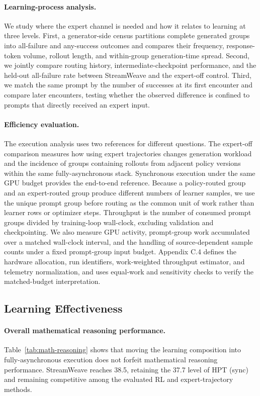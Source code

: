 \documentclass[letterpaper]{article}
\begin{document}
\paragraph{Learning-process analysis.}
We study where the expert channel is needed and how it relates to learning at three levels.
First, a generator-side census partitions complete generated groups into all-failure and any-success outcomes and compares their frequency, response-token volume, rollout length, and within-group generation-time spread.
Second, we jointly compare routing history, intermediate-checkpoint performance, and the held-out all-failure rate between StreamWeave and the expert-off control.
Third, we match the same prompt by the number of successes at its first encounter and compare later encounters, testing whether the observed difference is confined to prompts that directly received an expert input.

\paragraph{Efficiency evaluation.}
The execution analysis uses two references for different questions.
The expert-off comparison measures how using expert trajectories changes generation workload and the incidence of groups containing rollouts from adjacent policy versions within the same fully-asynchronous stack.
Synchronous execution under the same GPU budget provides the end-to-end reference.
Because a policy-routed group and an expert-routed group produce different numbers of learner samples, we use the unique prompt group before routing as the common unit of work rather than learner rows or optimizer steps.
Throughput is the number of consumed prompt groups divided by training-loop wall-clock, excluding validation and checkpointing.
We also measure GPU activity, prompt-group work accumulated over a matched wall-clock interval, and the handling of source-dependent sample counts under a fixed prompt-group input budget.
Appendix C.4 defines the hardware allocation, run identifiers, work-weighted throughput estimator, and telemetry normalization, and uses equal-work and sensitivity checks to verify the matched-budget interpretation.

\subsection{Learning Effectiveness}
\label{sec:learning-effectiveness}

\paragraph{Overall mathematical reasoning performance.}
Table~\ref{tab:math-reasoning} shows that moving the learning composition into fully-asynchronous execution does not forfeit mathematical reasoning performance.
StreamWeave reaches 38.5, retaining the 37.7 level of HPT (sync) and remaining competitive among the evaluated RL and expert-trajectory methods.
\end{document}
